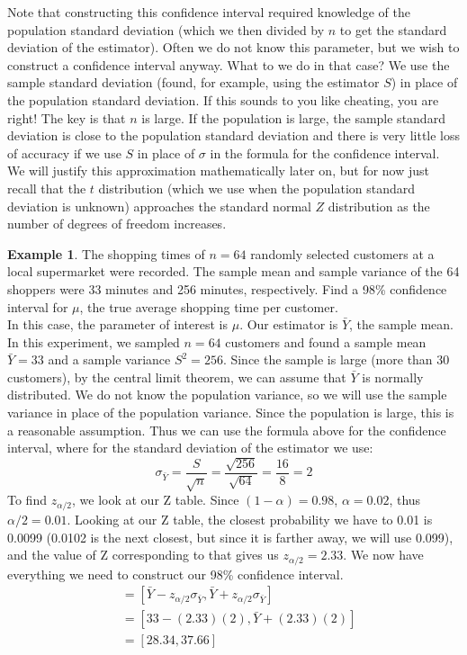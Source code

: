 \documentclass[12pt]{article}
\theoremstyle{definition}
\newtheorem*{example}{Example}
\theoremstyle{remark}
\begin{document}
Note that constructing this confidence interval required knowledge of the population standard deviation (which we then divided by $n$ to get the standard deviation of the estimator). Often we do not know this parameter, but we wish to construct a confidence interval anyway. What to we do in that case? We use the sample standard deviation (found, for example, using the estimator $S$) in place of the population standard deviation. If this sounds to you like cheating, you are right! The key is that $n$ is large. If the population is large, the sample standard deviation is close to the population standard deviation and there is very little loss of accuracy if we use $S$ in place of $\sigma$ in the formula for the confidence interval. We will justify this approximation mathematically later on, but for now just recall that the $t$ distribution (which we use when the population standard deviation is unknown) approaches the standard normal $Z$ distribution as the number of degrees of freedom increases.

\begin{example}The shopping times of $n = 64$ randomly selected customers at a local supermarket were recorded. The sample mean and sample variance of the 64 shoppers were 33 minutes and 256 minutes, respectively. Find a 98\% confidence interval for $\mu$, the true average shopping time per customer.\\

In this case, the parameter of interest is $\mu$. Our estimator is $\bar{Y}$, the sample mean. In this experiment, we sampled $n = 64$ customers and found a sample mean $\bar{Y} = 33$ and a sample variance $S^2 = 256$. Since the sample is large (more than 30 customers), by the central limit theorem, we can assume that $\bar{Y}$ is normally distributed. We do not know the population variance, so we will use the sample variance in place of the population variance. Since the population is large, this is a reasonable assumption. Thus we can use the formula above for the confidence interval, where for the standard deviation of the estimator we use:
\[
\sigma_{\bar{Y}} = \frac{S}{\sqrt{n}} = \frac{\sqrt{256}}{\sqrt{64}} = \frac{16}{8} = 2
\]
To find $z_{\alpha/2}$, we look at our Z table. Since $(1 - \alpha) = 0.98$, $\alpha = 0.02$, thus $\alpha/2 = 0.01$. Looking at our Z table, the closest probability we have to 0.01 is 0.0099 (0.0102 is the next closest, but since it is farther away, we will use 0.099), and the value of Z corresponding to that gives us $z_{\alpha/2} = 2.33$. We now have everything we need to construct our 98\% confidence interval.
\begin{align*}
[\bar{Y}_L, \bar{Y}_U] &= [ \bar{Y} - z_{\alpha/2} \sigma_{\bar{Y}}, \bar{Y} + z_{\alpha/2} \sigma_{\bar{Y}} ] \\
&= [ 33 - (2.33)(2), \bar{Y} + (2.33)(2) ] \\
&= [28.34, 37.66]
\end{align*}
\end{example}
\end{document}

